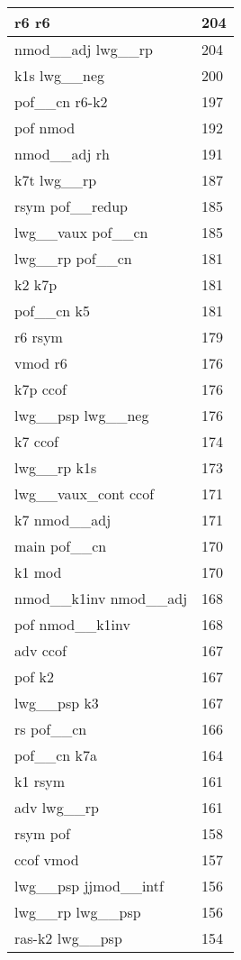 \documentclass[a4 paper]{article}
\begin{document}
\begin{longtable}{p{}p{}}
r6 r6  & 204 \\ \midrule
nmod\_\_adj lwg\_\_rp  & 204 \\ \midrule
k1s lwg\_\_neg  & 200 \\ \midrule
pof\_\_cn r6-k2  & 197 \\ \midrule
pof nmod  & 192 \\ \midrule
nmod\_\_adj rh  & 191 \\ \midrule
k7t lwg\_\_rp  & 187 \\ \midrule
rsym pof\_\_redup  & 185 \\ \midrule
lwg\_\_vaux pof\_\_cn  & 185 \\ \midrule
lwg\_\_rp pof\_\_cn  & 181 \\ \midrule
k2 k7p  & 181 \\ \midrule
pof\_\_cn k5  & 181 \\ \midrule
r6 rsym  & 179 \\ \midrule
vmod r6  & 176 \\ \midrule
k7p ccof  & 176 \\ \midrule
lwg\_\_psp lwg\_\_neg  & 176 \\ \midrule
k7 ccof  & 174 \\ \midrule
lwg\_\_rp k1s  & 173 \\ \midrule
lwg\_\_vaux\_cont ccof  & 171 \\ \midrule
k7 nmod\_\_adj  & 171 \\ \midrule
main pof\_\_cn  & 170 \\ \midrule
k1 mod  & 170 \\ \midrule
nmod\_\_k1inv nmod\_\_adj  & 168 \\ \midrule
pof nmod\_\_k1inv  & 168 \\ \midrule
adv ccof  & 167 \\ \midrule
pof k2  & 167 \\ \midrule
lwg\_\_psp k3  & 167 \\ \midrule
rs pof\_\_cn  & 166 \\ \midrule
pof\_\_cn k7a  & 164 \\ \midrule
k1 rsym  & 161 \\ \midrule
adv lwg\_\_rp  & 161 \\ \midrule
rsym pof  & 158 \\ \midrule
ccof vmod  & 157 \\ \midrule
lwg\_\_psp jjmod\_\_intf  & 156 \\ \midrule
lwg\_\_rp lwg\_\_psp  & 156 \\ \midrule
ras-k2 lwg\_\_psp  & 154 \\ \midrule

\end{longtable}
\end{document}
